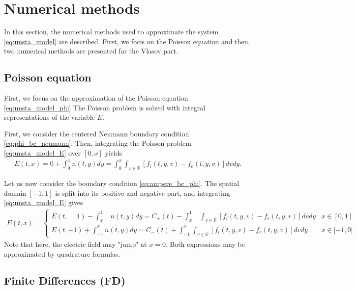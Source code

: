 \documentclass{article}
\numberwithin{equation}{section}
\newcommand{\R}{\mathbb{R}}
\begin{document}

\section{Numerical methods}
In this section, the numerical methods used to approximate the system \ref{eq:unsta_model} are described. 
First, we focis on the Poisson equation and  then, two numerical methods are presented for the Vlasov part. 

\subsection{Poisson equation}
First, we focus on the approximation of the Poisson equation \ref{eq:unsta_model_phi}
 The Poisson problem is solved with integral representations of the variable $E$.

First, we consider the centered Neumann boundary condition \cref{eq:phi_bc_neumann}. Then, integrating the Poisson problem \cref{eq:unsta_model_E} over $[0,x]$ yields
\begin{align}\label{eq:integral_representation_E_sym}
	E(t,x) = 0 + \int_0^x n(t,y) dy = \int_0^x \int_{v\in\R} [f_i(t,y,v) - f_e(t,y,v)] dv dy.
\end{align}

Let us now consider the boundary condition \ref{eq:ampere_bc_phi}. The spatial domain $[-1,1]$ is split into its positive and negative part, and integrating \cref{eq:unsta_model_E} gives
\begin{align}\label{eq:integral_representation_E_naturalbc}
	E(t,x) = 
	\begin{cases}
	E(t,\phantom{-}1) - \int_{x\phantom{-}}^{1} n(t,y) dy =  C_{+}(t) - \int_{x\phantom{-}}^1 \int_{v\in\R} [f_i(t,y,v) - f_e(t,y,v)] dv dy & x \in [0,1] \\
	E(t,-1) + \int_{-1}^x n(t,y) dy = C_{-}(t) + \int_{-1}^x \int_{v\in\R} [f_i(t,y,v) - f_e(t,y,v)] dv dy & x \in [-1,0[ 
	\end{cases}
\end{align}
Note that here, the electric field may "jump" at $x=0$. Both expressions may be approximated by quadrature formulas. 

\subsection{Finite Differences (FD)}
\end{document}
